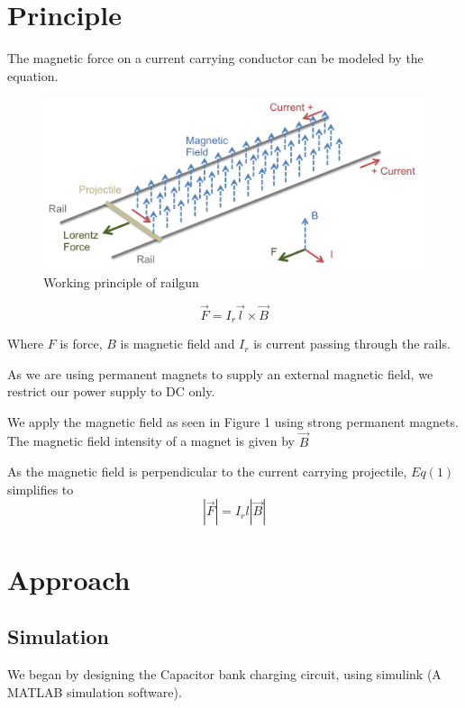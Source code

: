 \documentclass[twocolumn]{article}
\begin{document}
\section{Principle}

The magnetic force on a current carrying conductor can be modeled by the equation. 
	
\begin{figure}[htp]
	\caption{Working principle of railgun}
	\includegraphics[width=\linewidth]{railgun_physics.png}
\end{figure}
	
\begin{equation}
\vec{F}=I_{r} \vec{l} \times \vec{B}
\end{equation}

Where $F$ is force, $B$ is magnetic field and $I_{r}$ is current passing through the rails.

As we are using permanent magnets to supply an external magnetic field, we restrict our power supply to DC only.
 
	We apply the magnetic field as seen in Figure 1 using strong permanent magnets. The magnetic field intensity of a magnet is given by $\vec{B}$
	

As the magnetic field is perpendicular to the current carrying projectile, $Eq(1)$ simplifies to
 \[|\vec{F}|=I_{r} l|\vec{B}|\]



 

\section{Approach}

\subsection*{\textbf{Simulation}} 
We began by designing the Capacitor bank charging circuit, using simulink (A MATLAB simulation software).
\end{document}
